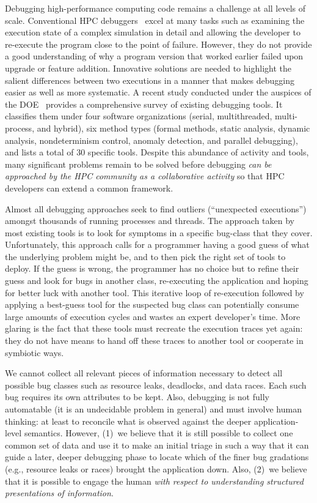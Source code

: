 Debugging high-performance computing code
remains a challenge at all levels of scale.
%
Conventional HPC debuggers~\cite{ddt,totalview}
excel at many tasks such as examining the execution
state of a complex simulation in detail
and allowing the developer to re-execute
the program close to the point of failure.
%
However, they do not provide a good understanding
of why a program version that worked earlier
failed upon upgrade or feature addition.
%
Innovative solutions are needed to highlight the
salient differences between two executions in a manner
that makes debugging easier as well as more systematic.
%
A recent study conducted under the auspices of the
DOE~\cite{hpcdoe}
provides a comprehensive survey
of existing debugging tools.
%
It classifies them under
four software organizations (serial, multithreaded,
multi-process, and hybrid), six
method types (formal methods, static analysis, dynamic
analysis, nondeterminism control, anomaly detection,
and parallel debugging), and lists a total of 30 specific
tools.
%
Despite this abundance of activity and tools, many
significant problems remain to be solved before debugging
{\em can be approached by the HPC community as a collaborative
activity} so that HPC developers can extend a common
framework.


Almost all debugging approaches seek to find outliers (``unexpected
executions'') amongst thousands of running processes and threads.
%
The approach taken by most existing tools is to
look for symptoms in a specific bug-class that they cover.
%
Unfortunately,
this approach calls for a programmer having a good guess of what
the underlying problem might be,
and to then pick the right set of tools to deploy.
%
If the guess is wrong, the programmer has no choice but to
refine their guess
and look for bugs in another class,
re-executing the application and hoping for
better luck with another tool.
%
This iterative loop of re-execution followed by applying a
best-guess tool for the suspected bug class can potentially consume
large amounts of execution cycles and wastes an
expert developer's time.
%
More glaring is the fact that these tools must recreate the
execution traces yet again: they do not have means to hand off
these traces to another tool or cooperate in symbiotic ways.



We cannot collect all relevant pieces of information
necessary to detect all possible bug classes such as
resource leaks, deadlocks, and data races.
%
Each such bug requires its own attributes to be kept.
%
Also, debugging is not fully automatable (it is
an undecidable problem in general) and must involve human thinking:
at least to reconcile what is observed against the deeper application-level semantics.
%
However, (1)~we believe that it is still possible to collect one common set
of data and use it to make an initial triage in such
a way that it can guide a later, deeper debugging phase to locate
which of the finer bug gradations (e.g., resource leaks or races) brought
the application down.
%
Also, (2)~we believe that it is possible to engage the human {\em with respect
to understanding structured presentations of information}.



